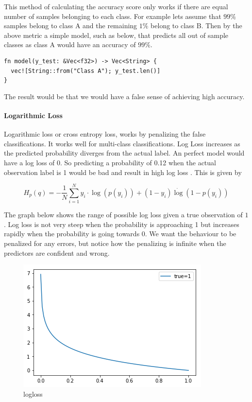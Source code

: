 \documentclass{book}
\begin{document}
This method of calculating the accuracy score only works if there are equal number of samples belonging to each class. For example lets assume that $99\%$ samples belong to class A and the remaining $1\%$ belong to class B. Then by the above metric a simple model, such as below, that predicts all out of sample classes as class A would have an accuracy of $99\%$.

\begin{lstlisting}[caption={my awesome machine learning model}]
fn model(y_test: &Vec<f32>) -> Vec<String> {
  vec![String::from("Class A"); y_test.len()]
}
\end{lstlisting}

The result would be that we would have a false sense of achieving high accuracy.
\label{par:accuracy}

\paragraph{Logarithmic Loss}%
Logarithmic loss or cross entropy loss, works by penalizing the false classifications. It works well for multi-class classifications. Log Loss increases as the predicted probability diverges from the actual label. An perfect model would have a log loss of 0. So predicting a probability of 0.12 when the actual observation label is 1 would be bad and result in high log loss\cite{WEBSITE:18} . This is given by

\begin{equation}
	H_p(q) = - \frac{1}{N}\sum_{i=1}^{N}y_i \cdot \log(p(y_i)) + (1-y_i) \dot \log(1-p(y_i))
\end{equation}

The graph below shows the range of possible log loss given a true observation of $1$. Log loss is not very steep when the probability is approaching 1 but increases rapidly when the probability is going towards 0. We want the behaviour to be penalized for any errors, but notice how the penalizing is infinite when the predictors are confident and wrong.

\begin{figure}[htpb]
	\centering
	\includegraphics[width=0.8\linewidth]{logloss.png}
	\caption{logloss}
	\label{fig:logloss}
\end{figure}
\end{document}
